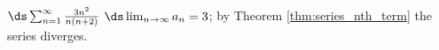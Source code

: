 {$\ds \sum_{n=1}^\infty \frac{3n^2}{n(n+2)}$
}
{$\ds \lim_{n\to\infty}a_n = 3$; by Theorem \ref{thm:series_nth_term} the series diverges.
}